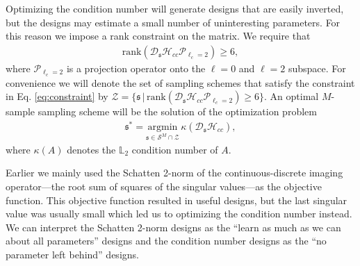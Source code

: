 \documentclass[11pt]{article}
\providecommand{\argmax}[1]{\underset{#1}{\mathrm{argmax}}\,}
\providecommand{\argmin}[1]{\underset{#1}{\mathrm{argmin}}\,}
\providecommand{\mc}[1]{\mathcal{#1}}
\providecommand{\mf}[1]{\mathfrak{#1}}
\providecommand{\mbb}[1]{\mathbb{#1}}
\begin{document}
Optimizing the condition number will generate designs that are easily inverted,
but the designs may estimate a small number of uninteresting parameters. For
this reason we impose a rank constraint on the matrix. We require that
\begin{align}
  \text{rank}(\mc{D}_{\mf{s}}\mc{H}_{cc}\mc{P}_{\ell_c = 2}) \geq 6, \label{eq:constraint}
\end{align}
where $\mc{P}_{\ell_c=2}$ is a projection operator onto the $\ell=0$ and
$\ell=2$ subspace. For convenience we will denote the set of sampling schemes
that satisfy the constraint in Eq. \eqref{eq:constraint} by
$\mc{Z} = \{\mf{s}\, |\, \text{rank}(\mc{D}_{\mf{s}}\mc{H}_{cc}\mc{P}_{\ell_c =
  2}) \geq 6\}$. An optimal $M$-sample sampling scheme will be the solution of the optimization problem 
\begin{align}
  \mf{s}^* = \argmin{\mf{s} \in \mc{S}^M \cap \mc{Z}}\kappa(\mc{D}_{\mf{s}}\mc{H}_{cc}), \label{eq:notimekappa}
\end{align}
where $\kappa(A)$ denotes the $\mbb{L}_2$ condition number of $A$.

Earlier we mainly used the Schatten 2-norm of the continuous-discrete imaging
operator---the root sum of squares of the singular values---as the objective
function. This objective function resulted in useful designs, but the last
singular value was usually small which led us to optimizing the condition number
instead. We can interpret the Schatten 2-norm designs as the ``learn as much as
we can about all parameters'' designs and the condition number designs as the
``no parameter left behind'' designs.


\end{document}
